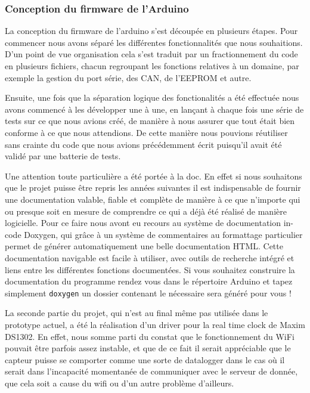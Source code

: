 		\subsubsection{Conception du firmware de l'Arduino}
		La conception du firmware de l'arduino s'est découpée en plusieurs étapes.
		Pour commencer nous avons séparé les différentes fonctionnalités que nous
		souhaitions. D'un point de vue organisation cela s'est traduit par un fractionnement
		du code en plusieurs fichiers, chacun regroupant les fonctions relatives à un
		domaine, par exemple la gestion du port série, des CAN, de l'EEPROM et autre.
		\par
		Ensuite, une fois que la séparation logique des fonctionalités a été effectuée
		nous avons commencé à les développer une à une, en lançant à chaque fois une
		série de tests sur ce que nous avions créé, de manière à nous assurer que tout
		était bien conforme à ce que nous attendions. De cette manière nous pouvions
		réutiliser sans crainte du code que nous avions précédemment écrit puisqu'il
		avait été validé par une batterie de tests.
		\par
		Une attention toute particulière a été portée à la doc. En effet si nous
		souhaitons que le projet puisse être repris les années suivantes il
		est indispensable de fournir une documentation valable, fiable et complète
		de manière à ce que n'importe qui ou presque soit en mesure de comprendre
		ce qui a déjà été réalisé de manière logicielle. Pour ce faire nous avont eu
		recours au système de documentation in-code Doxygen, qui grâce à un
		système de commentaires au formattage particulier permet de générer automatiquement
		une belle documentation HTML. Cette documentation navigable est facile à utiliser, avec outils
		de recherche intégré et liens entre les différentes fonctions documentées.
		Si vous souhaitez construire la documentation du programme rendez vous dans
		le répertoire Arduino et tapez simplement \texttt{doxygen} un dossier contenant
		le nécessaire sera généré pour vous !
		\par
		La seconde partie du projet, qui n'est au final même pas utilisée dans le prototype
		actuel, a été la réalisation d'un driver pour la real time clock de Maxim DS1302. En
		effet, nous somme parti du constat que le fonctionnement du WiFi pouvait être parfois
		assez instable, et que de ce fait il serait appréciable que le capteur puisse se comporter
		comme une sorte de datalogger dans le cas où il serait dans l'incapacité momentanée de communiquer
		avec le serveur de donnée, que cela soit a cause du wifi ou d'un autre problème d'ailleurs.
